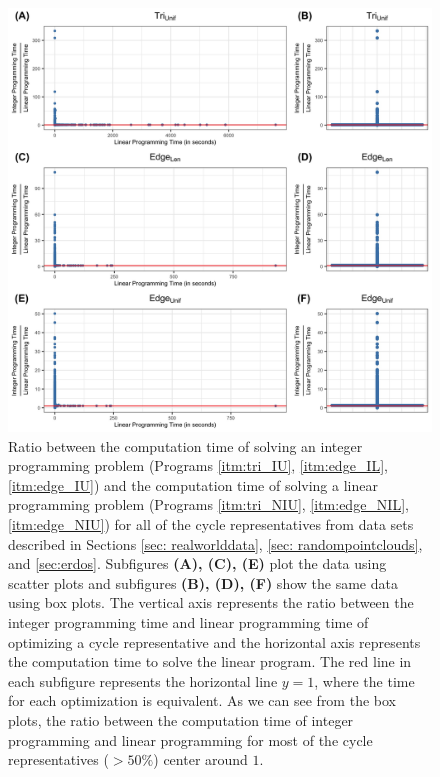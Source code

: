 \documentclass[11pt,onecolumn]{article}
\theoremstyle{plain}
\theoremstyle{definition}
\begin{document}
\begin{figure}[]
\begin{center}
\includegraphics[width=\textwidth]{figures/IPvsLP.jpg} 
\end{center}
 \caption{ 
 Ratio between the computation time of solving an integer programming problem (Programs \ref{itm:tri_IU}, \ref{itm:edge_IL}, \ref{itm:edge_IU}) and the computation time of solving a linear programming problem (Programs \ref{itm:tri_NIU}, \ref{itm:edge_NIL}, \ref{itm:edge_NIU}) for all of the cycle representatives from data sets described in Sections \ref{sec: realworlddata}, \ref{sec: randompointclouds}, and \ref{sec:erdos}. Subfigures  \textbf{(A), (C), (E)} plot the data using scatter plots and subfigures  \textbf{(B), (D), (F)} show the same data using box plots. The vertical axis represents the ratio between the integer programming time and linear programming time of optimizing a cycle representative and the horizontal axis represents the computation time to solve the linear program. The red line in each subfigure represents the horizontal line $y=1$, where the time for each optimization is equivalent. As we can see from the box plots, the ratio between the computation time of integer programming and linear programming for most of the cycle representatives ($>50\%$) center around $1$.}\label{fig:lp_mip_ratio_df}
\end{figure}
\end{document}

